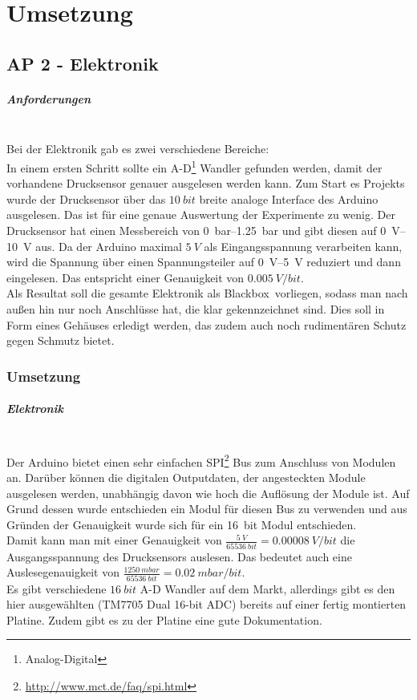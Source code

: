 \chapter{Umsetzung}

\section{AP 2 - Elektronik}

\paragraph{Anforderungen}
\hfill \\
Bei der Elektronik gab es zwei verschiedene Bereiche: \\
In einem ersten Schritt sollte ein A-D\footnote{Analog-Digital} Wandler gefunden werden, damit der vorhandene Drucksensor genauer ausgelesen werden kann. Zum Start es Projekts wurde der Drucksensor über das $\SI{10}{bit}$ breite analoge Interface des Arduino ausgelesen. Das ist für eine genaue Auswertung der Experimente zu wenig. Der Drucksensor hat einen Messbereich von \SIrange{0}{1,25}{\bar} und gibt diesen auf \SIrange{0}{10}{\volt} aus. Da der Arduino maximal $\SI{5}{V}$ als Eingangsspannung verarbeiten kann, wird die Spannung über einen Spannungsteiler auf \SIrange{0}{5}{\volt} reduziert und dann eingelesen. Das entspricht einer Genauigkeit von $\SI{0,005}{V/bit}$. \\
Als Resultat soll die gesamte Elektronik als \glqq Blackbox\grqq \ vorliegen, sodass man nach außen hin nur noch Anschlüsse hat, die klar gekennzeichnet sind. Dies soll in Form eines Gehäuses erledigt werden, das zudem auch noch rudimentären Schutz gegen Schmutz bietet.


\subsection{Umsetzung}

\paragraph{Elektronik}
\hfill \\
Der Arduino bietet einen sehr einfachen SPI\footnote{\url{http://www.mct.de/faq/spi.html}} Bus zum Anschluss von Modulen an. Darüber können die digitalen Outputdaten, der angesteckten Module ausgelesen werden, unabhängig davon wie hoch die Auflösung der Module ist. Auf Grund dessen wurde entschieden ein Modul für diesen Bus zu verwenden und aus Gründen der Genauigkeit wurde sich für ein \SI{16}{bit} Modul entschieden. \\
Damit kann man mit einer Genauigkeit von $\frac{\SI{5}{V}}{\SI{65536}{bit}} = \SI{0,00008}{V/bit}$ die Ausgangsspannung des Drucksensors auslesen. Das bedeutet auch eine Auslesegenauigkeit von $\frac{\SI{1250}{mbar}}{\SI{65536}{bit}} = \SI{0,02}{mbar/bit}$. \\
Es gibt verschiedene $\SI{16}{bit}$ A-D Wandler auf dem Markt, allerdings gibt es den hier ausgewählten (TM7705 Dual 16-bit ADC) bereits auf einer fertig montierten Platine. Zudem gibt es zu der Platine eine gute Dokumentation. 


